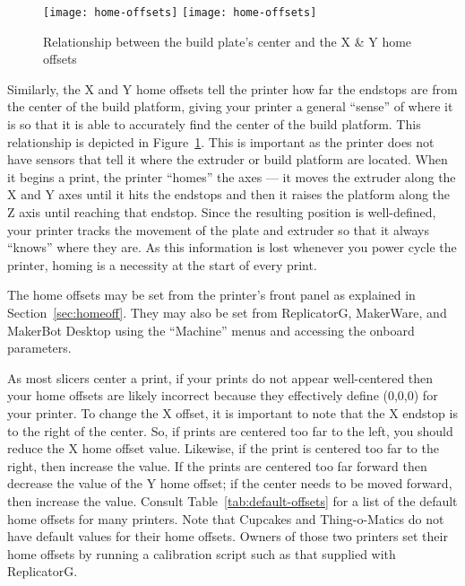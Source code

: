 \begin{figure}[!htbp]
  \centering
    \ifpdf
       \texttt{[image: home-offsets]}
    \else
       \texttt{[image: home-offsets]}
    \fi
    \caption{Relationship between the build plate's center and the X \& Y home offsets}
  \label{fig:xy-home-offsets}
\end{figure}

Similarly, the X and Y home offsets tell the printer how far the endstops are from the center of the build platform, giving your printer a general ``sense'' of where it is so that it is able to accurately find the center of the build platform.   This relationship is depicted in  Figure~\ref{fig:xy-home-offsets}. This is important as the printer does not have sensors that tell it where the extruder or build platform are located.  When it begins a print, the printer ``homes'' the axes --- it moves the extruder along the X and Y axes until it hits the endstops and then it raises the platform along the Z axis until reaching that endstop.  Since the resulting position is well-defined, your printer tracks the movement of the plate and extruder so that it always ``knows'' where they are.  As this information is lost whenever you power cycle the printer, homing is a necessity at the start of every print.

The home offsets may be set from the printer's front panel as explained in Section~\ref{sec:homeoff}.  They may also be set from ReplicatorG, MakerWare, and MakerBot Desktop using the ``Machine'' menus and accessing the onboard parameters.

As most \glspl{slicer} center a print, if your prints do not appear well-centered then your home offsets are likely incorrect because they effectively define (0,0,0) for your printer.   To change the X offset, it is important to note that the X endstop is to the right of the center.  So, if prints are centered too far to the left, you should reduce the X home offset value.  Likewise, if the print is centered too far to the right, then increase the value.  If the prints are centered too far forward then decrease the value of the Y home offset; if the center needs to be moved forward, then increase the value.  Consult Table~\ref{tab:default-offsets} for a list of the default home offsets for many printers.  Note that Cupcakes and Thing-o-Matics do not have default values for their home offsets.  Owners of those two printers set their home offsets by running a calibration script such as that supplied with ReplicatorG.

